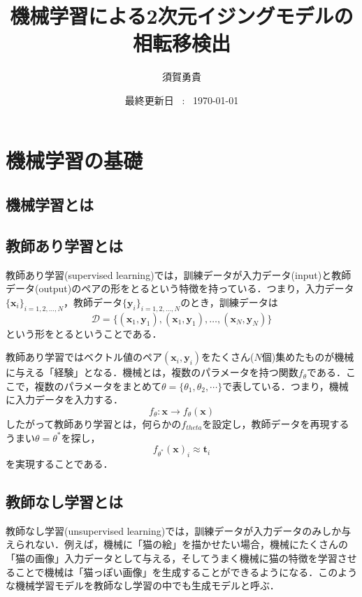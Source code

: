 \documentclass[a4paper,11pt]{jsarticle}
\begin{document}
\title{機械学習による2次元イジングモデルの相転移検出}
\author{須賀勇貴}
\date{最終更新日 \ : \ \today}
\maketitle

\tableofcontents
\clearpage

\section{機械学習の基礎}
\subsection{機械学習とは}
\subsection{教師あり学習とは}
教師あり学習(supervised learning)では，訓練データが入力データ(input)と教師データ(output)のペアの形をとるという特徴を持っている．つまり，入力データ$\{\bm{x}_i\}_{i=1,2,\dots,N}$，教師データ$\{\bm{y}_i\}_{i=1,2,\dots,N}$のとき，訓練データは
\begin{equation*}
  \mathcal{D} = \{ (\bm{x}_1, \bm{y}_1), (\bm{x}_1, \bm{y}_1), \dots ,(\bm{x}_N, \bm{y}_N) \}
\end{equation*}
という形をとるということである．\par
教師あり学習ではベクトル値のペア$(\bm{x}_i, \bm{y}_i)$をたくさん($N$個)集めたものが機械に与える「経験」となる．機械とは，複数のパラメータを持つ関数$f_{\theta}$である．ここで，複数のパラメータをまとめて$\theta = \{ \theta_1, \theta_2, \cdots \}$で表している．つまり，機械に入力データを入力する．
\begin{equation*}
  f_{\theta} : \bm{x} \rightarrow f_{\theta}(\bm{x})
\end{equation*}
したがって教師あり学習とは，何らかの$f_{theta}$を設定し，教師データを再現するうまい$\theta = \theta^*$を探し，
\begin{equation*}
  f_{\theta^*}(\bm{x})_i \approx \bm{t}_i
\end{equation*}
を実現することである．

\subsection{教師なし学習とは}
教師なし学習(unsupervised learning)では，訓練データが入力データのみしか与えられない．例えば，機械に「猫の絵」を描かせたい場合，機械にたくさんの「猫の画像」入力データとして与える，そしてうまく機械に猫の特徴を学習させることで機械は「猫っぽい画像」を生成することができるようになる．このような機械学習モデルを教師なし学習の中でも生成モデルと呼ぶ．
\end{document}
